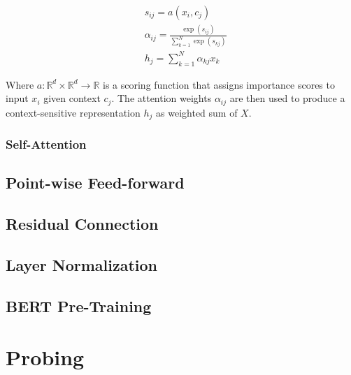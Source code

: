 \begin{align}
     & s_{ij} = a(x_i, c_j)                                         \\
     & \alpha_{ij} = \frac{\exp(s_{ij})}{\sum_{k=1}^N \exp(s_{kj})} \\
     & h_j = \sum_{k=1}^N \alpha_{kj} x_k
\end{align}

Where $a: \mathbb{R}^d \times \mathbb{R}^d \rightarrow \mathbb{R}$ is a scoring function that assigns importance scores to input $x_i$ given context $c_j$. The attention weights $\alpha_{ij}$ are then used to produce a context-sensitive representation $h_j$ as weighted sum of $X$.

\subsubsection{Self-Attention}

\subsection{Point-wise Feed-forward}

\subsection{Residual Connection}
\subsection{Layer Normalization}




\subsection{BERT Pre-Training}

\section{Probing}
